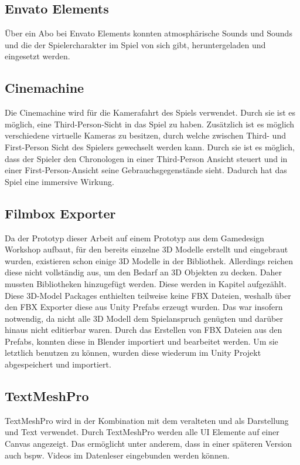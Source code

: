 \subsection{Envato Elements}
Über ein Abo bei Envato Elements konnten atmosphärische Sounds und Sounds und die der Spielercharakter im Spiel von sich gibt, heruntergeladen und eingesetzt werden.

\subsection{Cinemachine}
Die Cinemachine wird für die Kamerafahrt des Spiels verwendet. Durch sie ist es möglich, eine Third-Person-Sicht in das Spiel zu haben. Zusätzlich ist es möglich verschiedene virtuelle Kameras zu besitzen, durch welche zwischen Third- und First-Person Sicht des Spielers gewechselt werden kann. Durch sie ist es möglich, dass der Spieler den Chronologen in einer Third-Person Ansicht steuert und in einer First-Person-Ansicht seine Gebrauchsgegenstände sieht. Dadurch hat das Spiel eine immersive Wirkung.

\subsection{Filmbox Exporter}
Da der Prototyp dieser Arbeit auf einem Prototyp aus dem Gamedesign Workshop aufbaut, für den bereits einzelne \ac{3D} Modelle erstellt und eingebraut wurden, existieren schon einige \ac{3D} Modelle in der Bibliothek. Allerdings reichen diese nicht vollständig aus, um den Bedarf an \ac{3D} Objekten zu decken. Daher mussten Bibliotheken hinzugefügt werden. Diese werden in Kapitel  aufgezählt. Diese \ac{3D}-Model Packages enthielten teilweise keine \ac{FBX} Dateien, weshalb über den \ac{FBX} Exporter diese aus Unity Prefabs erzeugt wurden. Das war insofern notwendig, da nicht alle \ac{3D} Modell dem Spielanspruch genügten und darüber hinaus nicht editierbar waren. Durch das Erstellen von \ac{FBX} Dateien aus den Prefabs, konnten diese in Blender importiert und bearbeitet werden. Um sie letztlich benutzen zu können, wurden diese wiederum im Unity Projekt abgespeichert und importiert.

\subsection{TextMeshPro}
TextMeshPro wird in der Kombination mit dem veralteten  und  als Darstellung und Text verwendet. Durch TextMeshPro werden alle \ac{UI} Elemente auf einer Canvas angezeigt. Das ermöglicht unter anderem, dass in einer späteren Version auch bspw. Videos im Datenleser eingebunden werden können.

